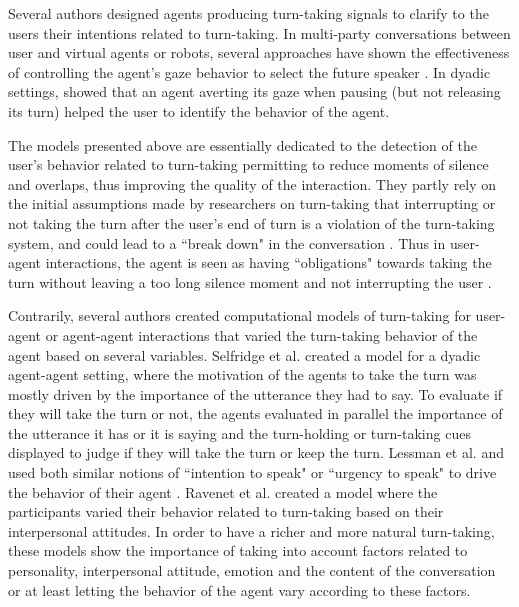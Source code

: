 Several authors designed agents producing turn-taking signals to clarify to the users their intentions related to turn-taking. In multi-party conversations between user and virtual agents or robots, several approaches have shown the effectiveness of controlling the agent's gaze behavior to select the future speaker \citep{mutlu_storytelling_2006,bohus_facilitating_2010,al_moubayed_regulating_2015}. In dyadic settings, \citep{skantze_turn-taking_2014} showed that an agent averting its gaze when pausing (but not releasing its turn) helped the user to identify the behavior of the agent.

The models presented above are essentially dedicated to the detection of the user's behavior related to turn-taking permitting
to reduce moments of silence and overlaps, thus improving the quality of the interaction. They partly rely on the initial assumptions made by researchers on
turn-taking that interrupting or not taking
the turn after the user's end of turn is a violation
of the turn-taking system, and could lead to a ``break
down" in the conversation \citep{cutler_analysis_1986}. Thus in user-agent interactions,
the agent is seen as having ``obligations" towards
taking the turn without leaving a too long silence
moment and not interrupting the user \citep{de_kok_multimodal_2009}.

Contrarily, several authors created computational models of
turn-taking for user-agent or agent-agent interactions
that varied the turn-taking behavior of the agent based
on several variables. Selfridge et al. \citep{selfridge_bidding_2009} created a model for a dyadic
agent-agent setting, where the motivation of the agents
to take the turn was mostly driven by the importance
of the utterance they had to say. To evaluate if they
will take the turn or not, the agents evaluated in parallel
the importance of the utterance it has or it is saying
and the turn-holding or turn-taking cues displayed to
judge if they will take the turn or keep the turn. Lessman et al. \citep{lessmann_towards_2004}and \citep{thorisson_multiparty_2010}
used both similar notions of ``intention to speak" \citep{lessmann_towards_2004} or
``urgency to speak" to drive the behavior of their agent
\citep{thorisson_multiparty_2010}. Ravenet et al. \citep{ravenet_conversational_2015} created a model where the participants varied
their behavior related to turn-taking based on their interpersonal
attitudes. In order to have a richer and more
natural turn-taking, these models show the importance
of taking into account factors related to personality,
interpersonal attitude, emotion and the content of the
conversation or at least letting the behavior of the agent
vary according to these factors.

